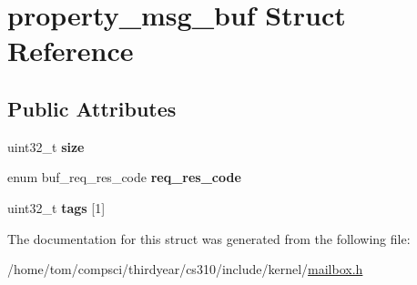 \hypertarget{structproperty__msg__buf}{}\section{property\+\_\+msg\+\_\+buf Struct Reference}
\label{structproperty__msg__buf}
\subsection*{Public Attributes}
\begin{DoxyCompactItemize}
\item 
\mbox{\label{structproperty__msg__buf_ad4b4c720db00a02d932d1612fe2a20ef}} 
uint32\+\_\+t {\bfseries size}
\item 
\mbox{\label{structproperty__msg__buf_aba955f380fb0ea9f1fd9e74d839f5a7b}} 
enum buf\+\_\+req\+\_\+res\+\_\+code {\bfseries req\+\_\+res\+\_\+code}
\item 
\mbox{\label{structproperty__msg__buf_a9692a39f569ed8f9ded0c8c5d5933cc6}} 
uint32\+\_\+t {\bfseries tags} \mbox{[}1\mbox{]}
\end{DoxyCompactItemize}


The documentation for this struct was generated from the following file\+:\begin{DoxyCompactItemize}
\item 
/home/tom/compsci/thirdyear/cs310/include/kernel/\mbox{\hyperlink{mailbox_8h}{mailbox.\+h}}\end{DoxyCompactItemize}

